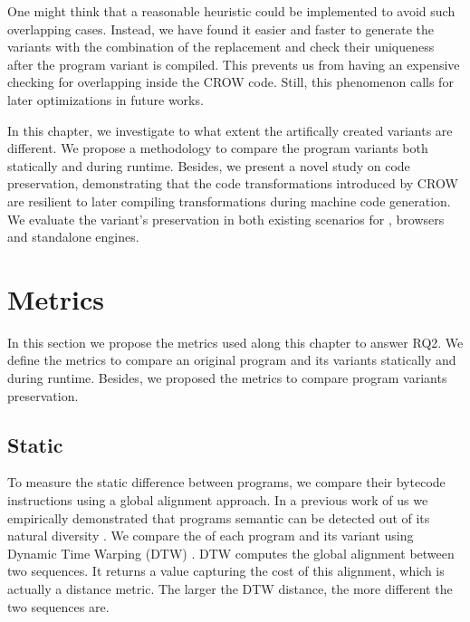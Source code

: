 One might think that a reasonable heuristic could be implemented to avoid such overlapping cases. Instead, we have found it easier and faster to generate the variants with the combination of the replacement and check their uniqueness after the program variant is compiled. This prevents us from having an expensive checking for overlapping inside the CROW code. Still, this phenomenon calls for later optimizations in future works.




In this chapter, we investigate to what extent the artifically created variants are different. We propose a methodology to compare the program variants both statically and during runtime. Besides, we present a novel study on code preservation, demonstrating that the code transformations introduced by CROW are resilient to later compiling transformations during machine code generation. We evaluate the variant's preservation in both existing scenarios for \wasm, browsers and standalone engines.

\section{Metrics}

In this section we propose the metrics used along this chapter to answer RQ2. We define the metrics to compare an original program and its variants statically and during runtime. Besides, we proposed the metrics to compare program variants preservation.

\subsection{Static}

To measure the static difference between programs, we compare their bytecode instructions using a global alignment approach. In a previous work of us  we empirically demonstrated that programs semantic can be detected out of its natural diversity \citationneeded. We compare the \wasm of each program and its variant using Dynamic Time Warping (DTW) \cite{Maia08usinga}. DTW computes the global alignment between two sequences. It returns a value capturing the cost of this alignment, which is actually a distance metric. The larger the DTW distance, the more different the two sequences are.


